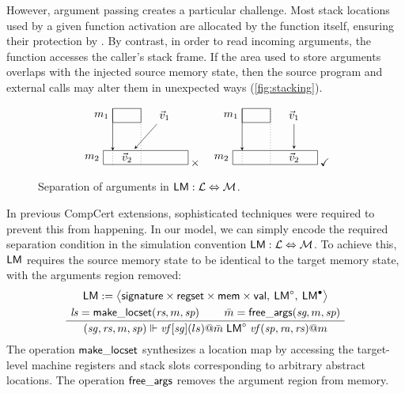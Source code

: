 \documentclass[sigplan,screen]{acmart}
\newenvironment{optional}{}{}
\begin{document}
\begin{optional}
However, argument passing creates a particular challenge.
Most stack locations used by a given function activation
are allocated by the function itself,
ensuring their protection by .
By contrast,
in order to read incoming arguments,
the function accesses the caller's stack frame.
If the area used to store arguments
overlaps with the injected source memory state,
then the source program and external calls
may alter them in unexpected ways
(\autoref{fig:stacking}).

\begin{figure}
\[
  \begin{tikzpicture}[xscale=0.3,yscale=0.45,>=stealth]
    \draw ( 1,3) rectangle +(3,1); \node[left] at (1,3.5) {$m_1$};
    \draw ( 0,0) rectangle +(9,1); \node[left] at (0,0.5) {$m_2$};
    \node (V1) at (6.5,3.5) {$\vec{v}_1$};
    \node (V2) at (2.5,0.5) {$\vec{v}_2$};
    \draw[->] (1,4) -- (1,1); \draw[dotted] (1,1) -- (1,0); \draw[dotted] (4,4) -- (4,0);
    \draw[->] (V1) -- (V2);
  \end{tikzpicture}
  \:{\times}
  \quad
  \begin{tikzpicture}[xscale=0.3,yscale=0.45,>=stealth]
    \draw ( 1,3) rectangle +(3,1); \node[left] at (1,3.5) {$m_1$};
    \draw ( 0,0) rectangle +(9,1); \node[left] at (0,0.5) {$m_2$};
    \node (V1) at (6.5,3.5) {$\vec{v}_1$};
    \node (V2) at (6.5,0.5) {$\vec{v}_2$};
    \draw[->] (1,4) -- (1,1); \draw[dotted] (1,1) -- (1,0); \draw[dotted] (4,4) -- (4,0);
    \draw[->] (V1) -- (V2);
  \end{tikzpicture}
  \:{\checkmark}
\]
  \caption{Separation of arguments in
    ${  \mathsf{LM}  } : \mathcal{L} \Leftrightarrow \mathcal{M}$.}
  \label{fig:stacking}
\end{figure}

In previous CompCert extensions,
sophisticated techniques were required
to prevent this from happening.
In our model,
we can simply encode the required separation condition
in the simulation convention
${  \mathsf{LM}  } : \mathcal{L} \Leftrightarrow \mathcal{M}$.
To achieve this,
${  \mathsf{LM}  }$ requires the source memory state
to be identical to the target memory state,
with the arguments region removed:
\begin{gather*}
  \cc{L}{M} :=
  \big\langle
    \kw{signature} \times
    \kw{regset} \times
    \kw{mem} \times
    \kw{val}, \:
    \cc{L}{M}^\que, \:
    \cc{L}{M}^\ans
  \big\rangle
\\
  \AxiomC{$\mathit{ls} = \kw{make\_locset}(\textit{rs}, m, \textit{sp})$}
  \AxiomC{$\bar{m} = \kw{free\_args}(\textit{sg}, m, \textit{sp})$}
  \BinaryInfC{$
    (\mathit{sg}, \mathit{rs}, m, \mathit{sp}) \Vdash
    \mathit{vf}[\mathit{sg}](ls)@\bar{m}
    \mathrel{\cc{L}{M}^\que}
    \mathit{vf}(\mathit{sp}, \mathit{ra}, \mathit{rs})@m$}
  \DisplayProof
\end{gather*}
The operation $ \mathsf{make\_locset} $ synthesizes a location map
by accessing the target-level machine registers and stack slots
corresponding to arbitrary abstract locations.
The operation $ \mathsf{free\_args} $ removes the argument region
from memory.


\end{optional}
\end{document}
